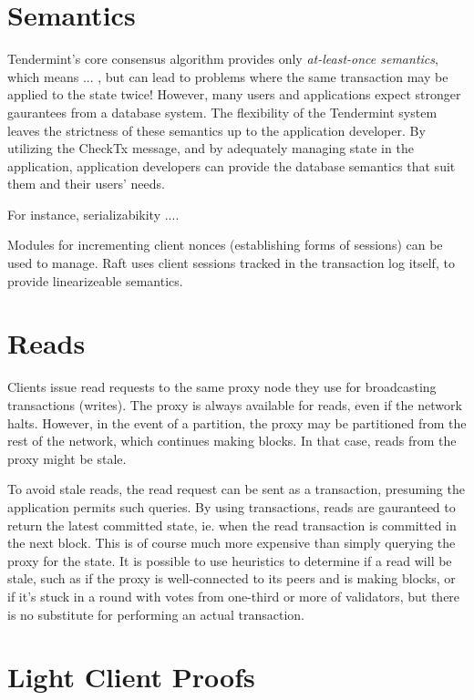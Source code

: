 \section{Semantics}

Tendermint's core consensus algorithm provides only \emph{at-least-once semantics}, which means ... ,
but can lead to problems where the same transaction may be applied to the state twice!
However, many users and applications expect stronger gaurantees from a database system.
The flexibility of the Tendermint system leaves the strictness of these semantics up to the application developer.
By utilizing the CheckTx message, and by adequately managing state in the application, 
application developers can provide the database semantics that suit them and their users' needs.

For instance, serializabikity ....

Modules for incrementing client nonces (establishing forms of sessions) can be used to manage.
Raft uses client sessions tracked in the transaction log itself, to provide linearizeable semantics.

\section{Reads} 

Clients issue read requests to the same proxy node they use for broadcasting transactions (writes).
The proxy is always available for reads, even if the network halts.
However, in the event of a partition, the proxy may be partitioned from the rest of the network, which continues making blocks.
In that case, reads from the proxy might be stale.

To avoid stale reads, the read request can be sent as a transaction, presuming the application permits such queries.
By using transactions, reads are gauranteed to return the latest committed state, ie. when the read transaction is committed in the next block.
This is of course much more expensive than simply querying the proxy for the state.
It is possible to use heuristics to determine if a read will be stale,
such as if the proxy is well-connected to its peers and is making blocks, 
or if it's stuck in a round with votes from one-third or more of validators,
but there is no substitute for performing an actual transaction.

\section{Light Client Proofs}


